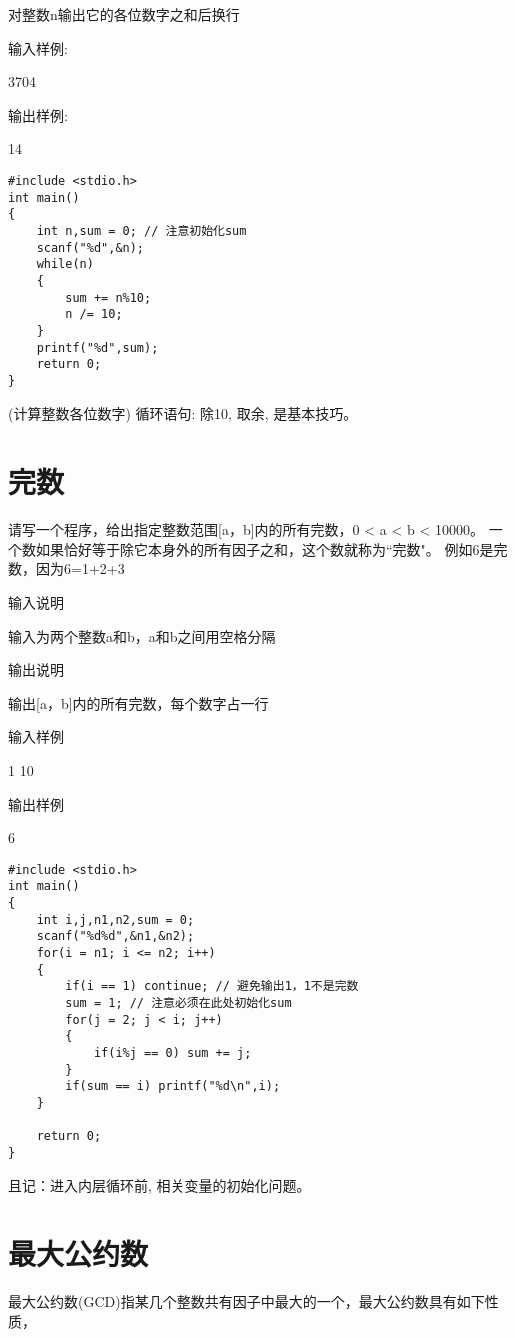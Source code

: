 对整数n输出它的各位数字之和后换行

输入样例:	

3704

输出样例:	

14

\begin{lstlisting}
#include <stdio.h>
int main()
{
	int n,sum = 0; // 注意初始化sum
	scanf("%d",&n);
	while(n)
	{
		sum += n%10;
		n /= 10;
	}
	printf("%d",sum);
	return 0;	
}
\end{lstlisting}

\begin{note}(计算整数各位数字)
	循环语句: 除10, 取余, 是基本技巧。
\end{note}

\section{完数}
请写一个程序，给出指定整数范围[a，b]内的所有完数，0 < a < b < 10000。
一个数如果恰好等于除它本身外的所有因子之和，这个数就称为``完数"。
例如6是完数，因为6=1+2+3

输入说明	

输入为两个整数a和b，a和b之间用空格分隔

输出说明	

输出[a，b]内的所有完数，每个数字占一行

输入样例	

1 10

输出样例	

6

\begin{lstlisting}
#include <stdio.h>
int main()
{
	int i,j,n1,n2,sum = 0;
	scanf("%d%d",&n1,&n2);
	for(i = n1; i <= n2; i++)
	{
		if(i == 1) continue; // 避免输出1，1不是完数 
		sum = 1; // 注意必须在此处初始化sum
		for(j = 2; j < i; j++)
		{
			if(i%j == 0) sum += j; 
		}
		if(sum == i) printf("%d\n",i);
	} 

	return 0;	
}
\end{lstlisting}

\begin{note}[特别注意]
	且记：进入内层循环前, 相关变量的初始化问题。	
\end{note}

\section{最大公约数}	
最大公约数(GCD)指某几个整数共有因子中最大的一个，最大公约数具有如下性质，

